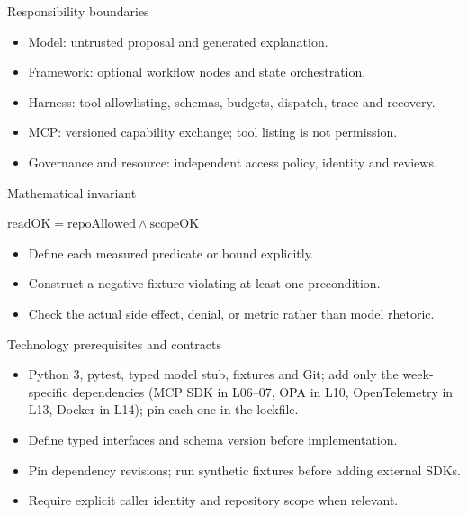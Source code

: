 \documentclass[aspectratio=169,10pt]{beamer}
\begin{document}
\begin{frame}{Responsibility boundaries}
\small
\begin{itemize}
\item Model: untrusted proposal and generated explanation.
\item Framework: optional workflow nodes and state orchestration.
\item Harness: tool allowlisting, schemas, budgets, dispatch, trace and recovery.
\item MCP: versioned capability exchange; tool listing is not permission.
\item Governance and resource: independent access policy, identity and reviews.
\end{itemize}

\end{frame}

\begin{frame}{Mathematical invariant}
\small
\begin{center}\Large $\mathrm{readOK}=\mathrm{repoAllowed}\land\mathrm{scopeOK}$\end{center}
\begin{itemize}
\item Define each measured predicate or bound explicitly.
\item Construct a negative fixture violating at least one precondition.
\item Check the actual side effect, denial, or metric rather than model rhetoric.
\end{itemize}

\end{frame}

\begin{frame}{Technology prerequisites and contracts}
\small
\begin{itemize}
\item Python 3, pytest, typed model stub, fixtures and Git; add only the week-specific dependencies (MCP SDK in L06--07, OPA in L10, OpenTelemetry in L13, Docker in L14); pin each one in the lockfile.
\item Define typed interfaces and schema version before implementation.
\item Pin dependency revisions; run synthetic fixtures before adding external SDKs.
\item Require explicit caller identity and repository scope when relevant.
\end{itemize}

\end{frame}
\end{document}
